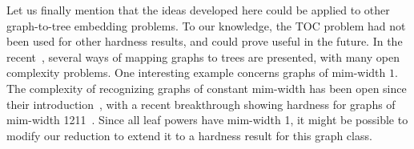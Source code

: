 \documentclass[11pt, letter]{article}
\theoremstyle{remark}
\begin{document}
Let us finally mention that the ideas developed here could be applied to other graph-to-tree embedding problems.  To our knowledge, the TOC problem had not been used for other hardness results, and could prove useful in the future.  In the recent~\cite{hogemo2025mapping}, several ways of mapping graphs to trees are presented, with many open complexity problems.  One interesting example concerns graphs of mim-width $1$.  The complexity of recognizing graphs of constant mim-width has been open since their introduction~\cite{jaffke2020mimI,jaffke2020mimII}, with a recent breakthrough showing hardness for graphs of mim-width 1211~\cite{bergougnoux2025mim}. Since all leaf powers have mim-width 1, it might be possible to modify our reduction to extend it to a hardness result for this graph class.   












% 
\end{document}
